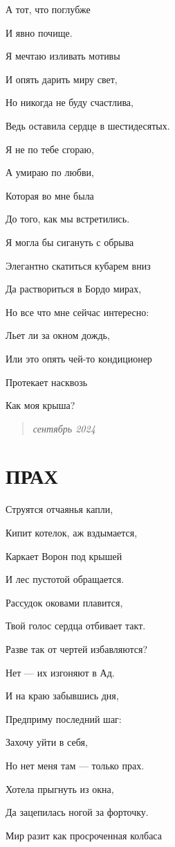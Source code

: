 \documentclass[
  a5paperpaper,
  DIV=11,
  numbers=noendperiod]{scrreprt}
\begin{document}
А тот, что поглубже

И явно почище.

Я мечтаю изливать мотивы

И опять дарить миру свет,

Но никогда не буду счастлива,

Ведь оставила сердце в шестидесятых.

Я не по тебе сгораю,

А умираю по любви,

Которая во мне была

До того, как мы встретились.

Я могла бы сигануть с обрыва

Элегантно скатиться кубарем вниз

Да раствориться в Бордо мирах,

Но все что мне сейчас интересно:

Льет ли за окном дождь,

Или это опять чей-то кондиционер

Протекает насквозь

Как моя крыша?

\begin{quote}
\emph{сентябрь 2024}
\end{quote}

\section{ПРАХ}\label{ux43fux440ux430ux445}

Струятся отчаянья капли,

Кипит котелок, аж вздымается,

Каркает Ворон под крышей

И лес пустотой обращается.

Рассудок оковами плавится,

Твой голос сердца отбивает такт.

Разве так от чертей избавляются?

Нет --- их изгоняют в Ад.

И на краю забывшись дня,

Предприму последний шаг:

Захочу уйти в себя,

Но нет меня там --- только прах.

Хотела прыгнуть из окна,

Да зацепилась ногой за форточку.

Мир разит как просроченная колбаса
\end{document}
